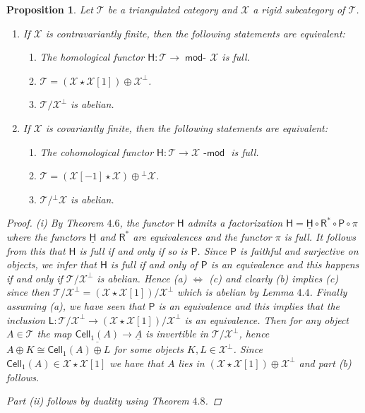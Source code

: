 \documentclass[oneside, a4paper,reqno]{amsart}
\numberwithin{equation}{section}
\newtheorem{prop}[thm]{Proposition}
\theoremstyle{definition}
\begin{document}
\begin{prop} Let ${\mathcal T}$ be a triangulated category and ${\mathcal X}$ a rigid subcategory of ${\mathcal T}$.  
\begin{enumerate} 
\item If ${\mathcal X}$ is contravariantly finite, then the following statements are equivalent:
\begin{enumerate} 
\item The homological functor $\mathsf{H} \colon {\mathcal T} {\longrightarrow} \operatorname*{\mathsf{mod}-\!}{\mathcal X}$ is full.  
\item ${\mathcal T} = ({\mathcal X} \star {\mathcal X}[1]) \oplus {\mathcal X}^{\bot}$. 
\item ${\mathcal T}/{\mathcal X}^{\bot}$ is abelian. 
\end{enumerate} 
\item If ${\mathcal X}$ is covariantly finite, then the following statements are equivalent:
\begin{enumerate} 
\item The cohomological functor $\mathsf{H} \colon {\mathcal T} {\longrightarrow} {\mathcal X}\operatorname*{\!-\mathsf{mod}}$ is full.  
\item ${\mathcal T} = ({\mathcal X}[-1] \star {\mathcal X}) \oplus {^{\bot}}{\mathcal X}$.
\item ${\mathcal T}/{^{\bot}}{\mathcal X}$ is abelian. 
\end{enumerate} 
\end{enumerate}
\begin{proof} (i) By Theorem $4.6$, the functor $\mathsf{H}$ admits a factorization $\mathsf{H} = \underline{\mathsf{H}} \circ \mathsf{R}^{*} \circ \mathsf{P} \circ \pi$ where the functors $\underline{\mathsf{H}}$ and $\mathsf{R}^{*}$ are equivalences and the functor $\pi$ is full. It follows from this that $\mathsf{H}$ is full if and only if so is $\mathsf{P}$. Since $\mathsf{P}$ is faithful and surjective on objects, we infer that $\mathsf{H}$ is full if and only of $\mathsf{P}$ is an equivalence and this happens if and only if ${\mathcal T}/{\mathcal X}^{\bot}$ is abelian. Hence (a) $\Leftrightarrow$ (c) and clearly (b) implies (c) since then ${\mathcal T}/{\mathcal X}^{\bot} = ({\mathcal X}\star{\mathcal X}[1])/{\mathcal X}^{\bot}$ which is abelian by Lemma $4.4$. Finally assuming (a), we have seen that $\mathsf{P}$ is an equivalence and this implies that the inclusion $\mathsf{L} \colon {\mathcal T}/{\mathcal X}^{\bot} {\longrightarrow} ({\mathcal X}\star {\mathcal X}[1])/{\mathcal X}^{\bot}$ is an equivalence. Then for any object $A \in {\mathcal T}$ the map $\underline{\mathsf{Cell}_{1}(A)} {\longrightarrow} {\underline A}$ is invertible in ${\mathcal T}/{\mathcal X}^{\bot}$,  hence  $A \oplus K \cong \mathsf{Cell}_{1}(A) \oplus L$ for some objects $K, L \in {\mathcal X}^{\bot}$. Since $\mathsf{Cell}_{1}(A) \in {\mathcal X}\star{\mathcal X}[1]$ we have that $A$ lies in $({\mathcal X} \star {\mathcal X}[1]) \oplus {\mathcal X}^{\bot}$ and part (b) follows.  

Part (ii) follows by duality using Theorem $4.8$. 
\end{proof}
\end{prop}
\end{document}
